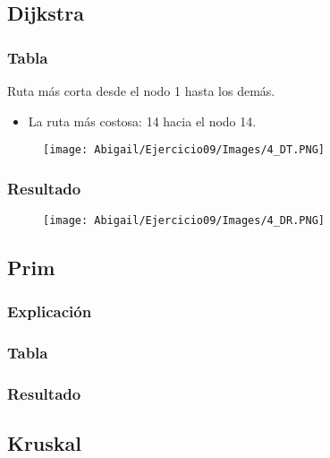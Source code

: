 \documentclass[12pt]{article}
\begin{document}
    \subsection{Dijkstra}

      \subsubsection{Tabla}
        Ruta más corta desde el nodo 1 hasta los demás.

        \begin{itemize}
          \item La ruta más costosa: 14 hacia el nodo 14.
        \end{itemize}

        \begin{figure}[h!]
          \centering
          \texttt{[image: Abigail/Ejercicio09/Images/4\_DT.PNG]}
        \end{figure} 

      \subsubsection{Resultado}
        \begin{figure}[h!]
          \centering
          \texttt{[image: Abigail/Ejercicio09/Images/4\_DR.PNG]}
        \end{figure} 

    \subsection{Prim}

      \subsubsection{Explicación}

      \subsubsection{Tabla}

      \subsubsection{Resultado}

    \subsection{Kruskal}
\end{document}
